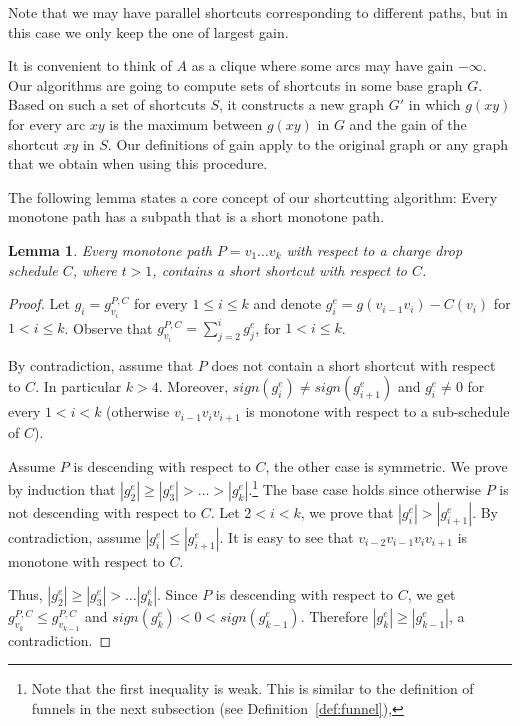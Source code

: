 \documentclass[11pt]{article}
\newtheorem{lemma}[theorem]{Lemma}
\begin{document}
Note that we may have parallel shortcuts corresponding to different paths, but in this case we  only keep the one of largest gain.

It is convenient to think of $A$ as a clique where some arcs may have gain $-\infty$.
Our algorithms are going to compute sets of shortcuts in some base graph $G$.
Based on such a set of shortcuts $S$, it constructs a new graph $G'$ in which $g(xy)$ for 
every arc $xy$ is the maximum between 
$g(xy)$ in $G$ and the gain of the shortcut $xy$ in $S$. Our definitions of gain apply to the original graph or any graph that we obtain when using this procedure.

The following lemma states a core concept of our shortcutting algorithm: Every monotone path has a subpath that is a short monotone path.

\begin{lemma}\label{lemma:mono-has-shortcut}
    Every monotone path $P=v_1 \ldots v_k$ with respect to a charge drop schedule $C$, where $t>1$, contains a short shortcut with respect to $C$.
\end{lemma}

\begin{proof}
    Let $g_i = g^{P,C}_{v_i}$ for every $1\le i \le k$ and denote $g^e_i = g(v_{i-1}v_{i})-C(v_{i})$ for $1 < i \le k$. 
    Observe that $g^{P,C}_{v_i}= \sum_{j=2}^i g^e_j$, for $1 < i \le k$.
    
    By contradiction, assume that $P$ does not contain a short shortcut with respect to $C$. In particular $k > 4$. Moreover, $sign(g^e_i)\neq sign(g^e_{i+1})$ and $g^e_i\neq 0$ for every $1 < i < k$ (otherwise $v_{i-1} v_i v_{i+1}$ is monotone with respect to a sub-schedule of $C$).
    
    Assume $P$ is descending with respect to $C$, the other case is symmetric. We prove by induction that $|g^e_2|\ge|g^e_3| > \ldots > |g^e_{k}|$.\footnote{Note that the first inequality is weak. This is similar to the definition of funnels in the next subsection (see Definition~\ref{def:funnel}),} The base case holds since otherwise $P$ is not descending with respect to $C$. Let $2<i < k$, we prove that $|g^e_i| > |g^e_{i+1}|$. By contradiction, assume $|g^e_i| \le |g^e_{i+1}|$. It is easy to see that $v_{i-2}v_{i-1}v_i v_{i+1}$ is monotone with respect to $C$.

    Thus, $|g^e_2|\ge|g^e_3| > \ldots |g^e_{k}|$. Since $P$ is descending with respect to $C$, we get $g^{P,C}_{v_k} \le g^{P,C}_{v_{k-1}}$ and $sign(g^e_{k}) < 0 < sign(g^e_{k-1})$. Therefore $|g^e_{k}| \ge |g^e_{{k-1}}|$, a contradiction.
\end{proof}
\end{document}
